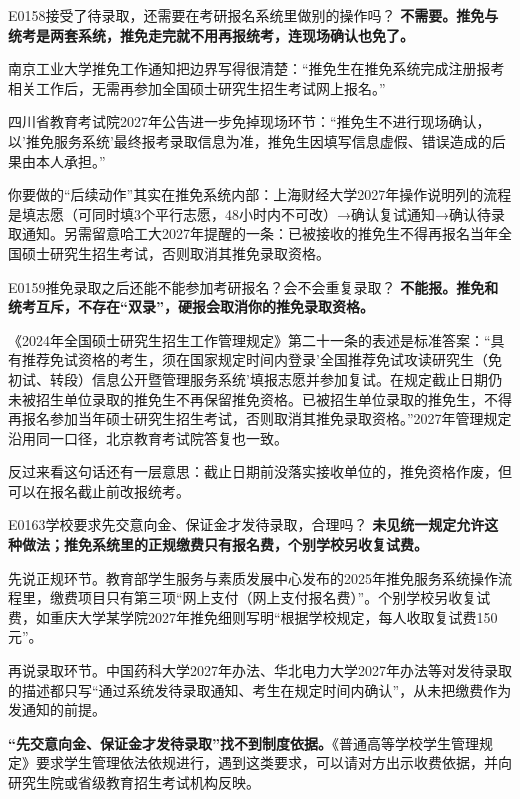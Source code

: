 \begin{qa}{E0158}{接受了待录取，还需要在考研报名系统里做别的操作吗？}
\textbf{不需要。推免与统考是两套系统，推免走完就不用再报统考，连现场确认也免了。}

南京工业大学推免工作通知把边界写得很清楚：“推免生在推免系统完成注册报考相关工作后，无需再参加全国硕士研究生招生考试网上报名。”

四川省教育考试院2027年公告进一步免掉现场环节：“推免生不进行现场确认，以'推免服务系统'最终报考录取信息为准，推免生因填写信息虚假、错误造成的后果由本人承担。”

你要做的“后续动作”其实在推免系统内部：上海财经大学2027年操作说明列的流程是填志愿（可同时填3个平行志愿，48小时内不可改）→确认复试通知→确认待录取通知。另需留意哈工大2027年提醒的一条：已被接收的推免生不得再报名当年全国硕士研究生招生考试，否则取消其推免录取资格。
\end{qa}

\begin{qa}{E0159}{推免录取之后还能不能参加考研报名？会不会重复录取？}
\textbf{不能报。推免和统考互斥，不存在“双录”，硬报会取消你的推免录取资格。}

《2024年全国硕士研究生招生工作管理规定》第二十一条的表述是标准答案：“具有推荐免试资格的考生，须在国家规定时间内登录'全国推荐免试攻读研究生（免初试、转段）信息公开暨管理服务系统'填报志愿并参加复试。在规定截止日期仍未被招生单位录取的推免生不再保留推免资格。已被招生单位录取的推免生，不得再报名参加当年硕士研究生招生考试，否则取消其推免录取资格。”2027年管理规定沿用同一口径，北京教育考试院答复也一致。

反过来看这句话还有一层意思：截止日期前没落实接收单位的，推免资格作废，但可以在报名截止前改报统考。
\end{qa}

\begin{qa}{E0163}{学校要求先交意向金、保证金才发待录取，合理吗？}
\textbf{未见统一规定允许这种做法；推免系统里的正规缴费只有报名费，个别学校另收复试费。}

先说正规环节。教育部学生服务与素质发展中心发布的2025年推免服务系统操作流程里，缴费项目只有第三项“网上支付（网上支付报名费）”。个别学校另收复试费，如重庆大学某学院2027年推免细则写明“根据学校规定，每人收取复试费150元”。

再说录取环节。中国药科大学2027年办法、华北电力大学2027年办法等对发待录取的描述都只写“通过系统发待录取通知、考生在规定时间内确认”，从未把缴费作为发通知的前提。

\textbf{“先交意向金、保证金才发待录取”找不到制度依据。}《普通高等学校学生管理规定》要求学生管理依法依规进行，遇到这类要求，可以请对方出示收费依据，并向研究生院或省级教育招生考试机构反映。
\end{qa}

